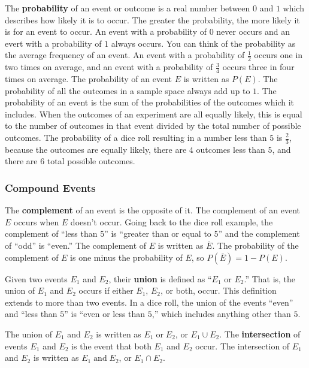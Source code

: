 \documentclass[twocolumn]{article}
\newcommand{\pand}{\mathop\text{and}}
\newcommand{\por}{\mathop\text{or}}
\begin{document}
The \textbf{probability} of an event or outcome is a real number between $0$ and $1$ which describes how likely it is to occur.
The greater the probability, the more likely it is for an event to occur.
An event with a probability of $0$ never occurs and an evert with a probability of $1$ always occurs.
You can think of the probability as the average frequency of an event.
An event with a probability of $\frac{1}{2}$ occurs one in two times on average, and an event with a probability of $\frac{3}{4}$ occurs three in four times on average.
The probability of an event $E$ is written as $P(E)$.
The probability of all the outcomes in a sample space always add up to $1$.
The probability of an event is the sum of the probabilities of the outcomes which it includes.
When the outcomes of an experiment are all equally likely, this is equal to the number of outcomes in that event divided by the total number of possible outcomes.
The probability of a dice roll resulting in a number less than $5$ is $\frac{2}{3}$, because the outcomes are equally likely, there are $4$ outcomes less than $5$, and there are $6$ total possible outcomes.

\subsubsection*{Compound Events}
The \textbf{complement} of an event is the opposite of it.
The complement of an event $E$ occurs when $E$ doesn't occur.
Going back to the dice roll example, the complement of ``less than $5$'' is ``greater than or equal to $5$'' and the complement of ``odd'' is ``even.'' The complement of $E$ is written as $\overline{E}$.
The probability of the complement of $E$ is one minus the probability of $E$, so $P(\overline{E}) = 1 - P(E)$.

Given two events $E_1$ and $E_2$, their \textbf{union} is defined as ``$E_1$ or $E_2$.'' That is, the union of $E_1$ and $E_2$ occurs if either $E_1$, $E_2$, or both, occur.
This definition extends to more than two events.
In a dice roll, the union of the events ``even'' and ``less than $5$'' is ``even or less than $5$,'' which includes anything other than $5$.

The union of $E_1$ and $E_2$ is written as $E_1 \por E_2$, or $E_1 \cup E_2$.
The \textbf{intersection} of events $E_1$ and $E_2$ is the event that both $E_1$ and $E_2$ occur.
The intersection of $E_1$ and $E_2$ is written as $E_1 \pand E_2$, or $E_1 \cap E_2$.
\end{document}
